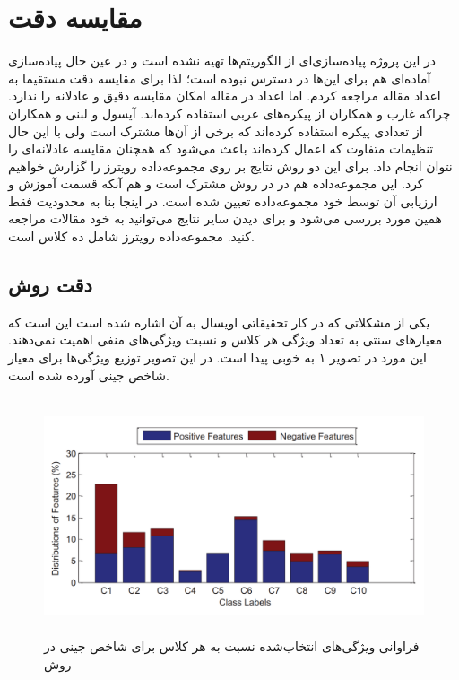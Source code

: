 \section{مقایسه دقت}
در این پروژه پیاده‌سازی‌ای از الگوریتم‌ها تهیه نشده است و در عین حال پیاده‌سازی آماده‌ای هم برای این‌ها در دسترس نبوده است؛ لذا برای مقایسه دقت مستقیما به اعداد مقاله مراجعه کردم. اما اعداد در مقاله امکان مقایسه دقیق و عادلانه را ندارد. چراکه غارب و همکاران از پیکره‌های عربی استفاده کرده‌اند. آیسول و لبنی و همکاران از تعدادی پیکره استفاده کرده‌اند که برخی از آن‌ها مشترک است ولی با این حال تنظیمات متفاوت که اعمال کرده‌اند باعث می‌شود که همچنان مقایسه عادلانه‌ای را نتوان انجام داد. برای این دو روش نتایج بر روی مجموعه‌داده رویترز را گزارش خواهیم کرد. این مجموعه‌داده هم در در روش مشترک است و هم آنکه قسمت آموزش و ارزیابی آن توسط خود مجموعه‌داده تعیین شده است. در اینجا بنا به محدودیت فقط همین مورد بررسی می‌شود و برای دیدن سایر نتایج می‌توانید به خود مقالات مراجعه کنید. مجموعه‌داده رویترز شامل ده کلاس است.

\subsection{دقت روش }
یکی از مشکلاتی که در کار تحقیقاتی اویسال به آن اشاره شده است این است که معیار‌های سنتی به تعداد ویژگی هر کلاس و نسبت ویژگی‌های منفی اهمیت نمی‌دهند. این مورد در تصویر ۱ به خوبی پیدا است. در این تصویر توزیع ویژگی‌ها برای معیار شاخص جینی آورده شده است.

\begin{figure}[!h]
\begin{center}
\includegraphics[height=7cm]{IGFSS1.png}
\end{center}
\caption{فراوانی ویژگی‌های انتخاب‌شده نسبت به هر کلاس برای شاخص جینی در روش  \cite{uysal2016improved} }
\end{figure}

